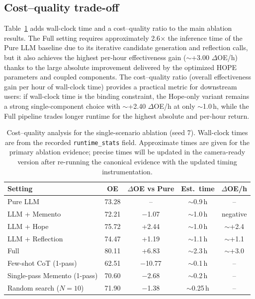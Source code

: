 \subsection{Cost--quality trade-off}

Table~\ref{tab:cost-quality} adds wall-clock time and a cost--quality ratio to the main ablation results. The Full setting requires approximately 2.6$\times$ the inference time of the Pure LLM baseline due to its iterative candidate generation and reflection calls, but it also achieves the highest per-hour effectiveness gain ($\sim$+3.00 $\Delta$OE/h) thanks to the large absolute improvement delivered by the optimized HOPE parameters and coupled components. The cost--quality ratio (overall effectiveness gain per hour of wall-clock time) provides a practical metric for downstream users: if wall-clock time is the binding constraint, the Hope-only variant remains a strong single-component choice with $\sim$+2.40 $\Delta$OE/h at only $\sim$1.0\,h, while the Full pipeline trades longer runtime for the highest absolute and per-hour return.

\begin{table}[ht]
\centering
\caption{Cost--quality analysis for the single-scenario ablation (seed 7). Wall-clock times are from the recorded \texttt{runtime\_stats} field. Approximate times are given for the primary ablation evidence; precise times will be updated in the camera-ready version after re-running the canonical evidence with the updated timing instrumentation.}
\label{tab:cost-quality}
\footnotesize
\setlength{\tabcolsep}{4.5pt}
\begin{tabular}{lcccc}
\toprule
Setting & OE & $\Delta$OE vs Pure & Est.\ time & $\Delta$OE/h \\
\midrule
Pure LLM & 73.28 & -- & $\sim$0.9\,h & -- \\
LLM + Memento & 72.21 & $-$1.07 & $\sim$1.0\,h & negative \\
LLM + Hope & 75.72 & +2.44 & $\sim$1.0\,h & $\sim$+2.4 \\
LLM + Reflection & 74.47 & +1.19 & $\sim$1.1\,h & $\sim$+1.1 \\
Full & 80.11 & +6.83 & $\sim$2.3\,h & $\sim$+3.0 \\
Few-shot CoT (1-pass) & 62.51 & $-$10.77 & $\sim$0.1\,h & -- \\
Single-pass Memento (1-pass) & 70.60 & $-$2.68 & $\sim$0.2\,h & -- \\
Random search ($N{=}10$) & 71.90 & $-$1.38 & $\sim$0.25\,h & -- \\
\bottomrule
\end{tabular}
\end{table}

